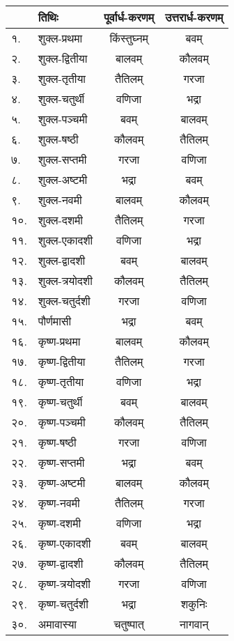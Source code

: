 \begingroup
\normalsize
\begin{longtable}{llcc}
  & तिथिः       & पूर्वार्ध-करणम् & उत्तरार्ध-करणम् \\\endhead
  १.  & शुक्ल-प्रथमा   & किंस्तुघ्नम्     & बवम्          \\
  २.  & शुक्ल-द्वितीया & बालवम्       & कौलवम्        \\
  ३.  & शुक्ल-तृतीया   & तैतिलम्       & गरजा         \\
  ४.  & शुक्ल-चतुर्थी   & वणिजा       & भद्रा         \\
  ५.  & शुक्ल-पञ्चमी   & बवम्         & बालवम्        \\
  ६.  & शुक्ल-षष्ठी    & कौलवम्       & तैतिलम्        \\
  ७.  & शुक्ल-सप्तमी   & गरजा        & वणिजा        \\
  ८.  & शुक्ल-अष्टमी   & भद्रा        & बवम्          \\
  ९.  & शुक्ल-नवमी    & बालवम्       & कौलवम्        \\
  १०. & शुक्ल-दशमी    & तैतिलम्       & गरजा         \\
  ११. & शुक्ल-एकादशी  & वणिजा       & भद्रा         \\
  १२. & शुक्ल-द्वादशी  & बवम्         & बालवम्        \\
  १३. & शुक्ल-त्रयोदशी & कौलवम्       & तैतिलम्        \\
  १४. & शुक्ल-चतुर्दशी  & गरजा        & वणिजा        \\
  १५. & पौर्णमासी    & भद्रा        & बवम्          \\
  १६. & कृष्ण-प्रथमा   & बालवम्       & कौलवम्        \\
  १७. & कृष्ण-द्वितीया & तैतिलम्       & गरजा         \\
  १८. & कृष्ण-तृतीया   & वणिजा       & भद्रा         \\
  १९. & कृष्ण-चतुर्थी   & बवम्         & बालवम्        \\
  २०. & कृष्ण-पञ्चमी   & कौलवम्       & तैतिलम्        \\
  २१. & कृष्ण-षष्ठी    & गरजा        & वणिजा        \\
  २२. & कृष्ण-सप्तमी   & भद्रा        & बवम्          \\
  २३. & कृष्ण-अष्टमी   & बालवम्       & कौलवम्        \\
  २४. & कृष्ण-नवमी    & तैतिलम्       & गरजा         \\
  २५. & कृष्ण-दशमी    & वणिजा       & भद्रा         \\
  २६. & कृष्ण-एकादशी  & बवम्         & बालवम्        \\
  २७. & कृष्ण-द्वादशी  & कौलवम्       & तैतिलम्        \\
  २८. & कृष्ण-त्रयोदशी & गरजा        & वणिजा        \\
  २९. & कृष्ण-चतुर्दशी  & भद्रा        & शकुनिः        \\
  ३०. & अमावास्या    & चतुष्पात्      & नागवान्       \\
\end{longtable}


